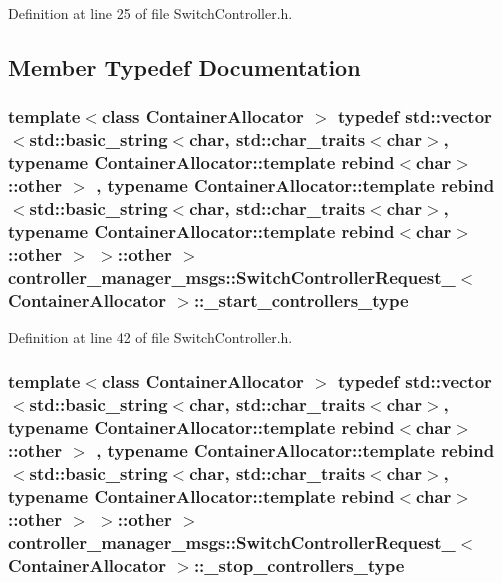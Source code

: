 \-Definition at line 25 of file \-Switch\-Controller.\-h.



\subsection{\-Member \-Typedef \-Documentation}
\subsubsection[{\-\_\-start\-\_\-controllers\-\_\-type}]{\setlength{\rightskip}{0pt plus 5cm}template$<$class Container\-Allocator $>$ typedef std\-::vector$<$std\-::basic\-\_\-string$<$char, std\-::char\-\_\-traits$<$char$>$, typename \-Container\-Allocator\-::template rebind$<$char$>$\-::other $>$ , typename \-Container\-Allocator\-::template rebind$<$std\-::basic\-\_\-string$<$char, std\-::char\-\_\-traits$<$char$>$, typename \-Container\-Allocator\-::template rebind$<$char$>$\-::other $>$ $>$\-::other $>$ {\bf controller\-\_\-manager\-\_\-msgs\-::\-Switch\-Controller\-Request\-\_\-}$<$ \-Container\-Allocator $>$\-::{\bf \-\_\-start\-\_\-controllers\-\_\-type}}\label{structcontroller__manager__msgs_1_1SwitchControllerRequest___adfa83e85f77c1e870e63b415ef65ce01}


\-Definition at line 42 of file \-Switch\-Controller.\-h.

\subsubsection[{\-\_\-stop\-\_\-controllers\-\_\-type}]{\setlength{\rightskip}{0pt plus 5cm}template$<$class Container\-Allocator $>$ typedef std\-::vector$<$std\-::basic\-\_\-string$<$char, std\-::char\-\_\-traits$<$char$>$, typename \-Container\-Allocator\-::template rebind$<$char$>$\-::other $>$ , typename \-Container\-Allocator\-::template rebind$<$std\-::basic\-\_\-string$<$char, std\-::char\-\_\-traits$<$char$>$, typename \-Container\-Allocator\-::template rebind$<$char$>$\-::other $>$ $>$\-::other $>$ {\bf controller\-\_\-manager\-\_\-msgs\-::\-Switch\-Controller\-Request\-\_\-}$<$ \-Container\-Allocator $>$\-::{\bf \-\_\-stop\-\_\-controllers\-\_\-type}}\label{structcontroller__manager__msgs_1_1SwitchControllerRequest___ac6ea2fe4db496482425f2c069587425e}


